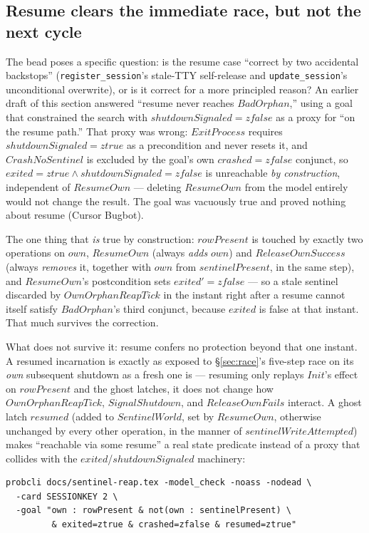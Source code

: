 \documentclass[a4paper,10pt,fleqn]{article}
\begin{document}
\subsection{Resume clears the immediate race, but not the next cycle}
\label{sec:resume-safe}

The bead poses a specific question: is the resume case ``correct by two
accidental backstops'' (\texttt{register\_session}'s stale-TTY
self-release and \texttt{update\_session}'s unconditional overwrite),
or is it correct for a more principled reason?  An earlier draft of
this section answered ``resume never reaches $BadOrphan$,'' using a
goal that constrained the search with $shutdownSignaled = zfalse$ as a
proxy for ``on the resume path.''  That proxy was wrong: $ExitProcess$
requires $shutdownSignaled = ztrue$ as a precondition and never resets
it, and $CrashNoSentinel$ is excluded by the goal's own $crashed =
zfalse$ conjunct, so $exited = ztrue \land shutdownSignaled = zfalse$
is unreachable \emph{by construction}, independent of $ResumeOwn$ ---
deleting $ResumeOwn$ from the model entirely would not change the
result.  The goal was vacuously true and proved nothing about resume
(Cursor Bugbot).

The one thing that \emph{is} true by construction: $rowPresent$ is
touched by exactly two operations on $own$, $ResumeOwn$ (always
\emph{adds} $own$) and $ReleaseOwnSuccess$ (always \emph{removes} it,
together with $own$ from $sentinelPresent$, in the same step), and
$ResumeOwn$'s postcondition sets $exited' = zfalse$ --- so a stale
sentinel discarded by $OwnOrphanReapTick$ in the instant right after a
resume cannot itself satisfy $BadOrphan$'s third conjunct, because
$exited$ is false at that instant.  That much survives the correction.

What does not survive it: resume confers no protection beyond that one
instant.  A resumed incarnation is exactly as exposed to
\S\ref{sec:race}'s five-step race on its \emph{own} subsequent
shutdown as a fresh one is --- resuming only replays $Init$'s effect on
$rowPresent$ and the ghost latches, it does not change how
$OwnOrphanReapTick$, $SignalShutdown$, and $ReleaseOwnFails$ interact.
A ghost latch $resumed$ (added to $SentinelWorld$, set by $ResumeOwn$,
otherwise unchanged by every other operation, in the manner of
$sentinelWriteAttempted$) makes ``reachable via some resume'' a real
state predicate instead of a proxy that collides with the
$exited$/$shutdownSignaled$ machinery:

\begin{verbatim}
probcli docs/sentinel-reap.tex -model_check -noass -nodead \
  -card SESSIONKEY 2 \
  -goal "own : rowPresent & not(own : sentinelPresent) \
         & exited=ztrue & crashed=zfalse & resumed=ztrue"
\end{verbatim}
\end{document}
